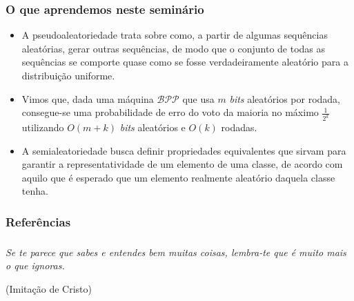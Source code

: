 \documentclass{beamer}
\def\clBPP{\mathcal{BPP}}
\theoremstyle{teoaxicorlem}
\theoremstyle{defnotnom}
\begin{document}
\begin{frame}
  \frametitle{O que aprendemos neste seminário}
  \begin{itemize}
    \item A pseudoaleatoriedade trata sobre como, a partir de algumas
      sequências aleatórias, gerar outras sequências, de modo que
      o conjunto
      de todas as sequências se comporte quase
      como se fosse verdadeiramente
      aleatório para a distribuição uniforme.\pause
    \item Vimos que, dada uma máquina $\clBPP$ que usa $m$
      \textit{bits} aleatórios por
      rodada, consegue-se uma probabilidade de erro do voto da maioria
      no      máximo $\frac{1}{2^k}$ utilizando $O(m+k)$ \textit{bits}
      aleatórios      e      $O(k)$ rodadas.\pause
    \item A semialeatoriedade busca definir propriedades equivalentes
      que sirvam para garantir a representatividade de um elemento de
      uma classe, de acordo com aquilo que é esperado que um elemento
      realmente aleatório daquela classe tenha.
  \end{itemize}
\end{frame}

\begin{frame}
  \frametitle{Referências}
  \nocite{Quasi-random-subsets}
  \nocite{Quasi-random-graphs}
  \nocite{Chazelle-2000}
  
  
\end{frame}

\begin{frame}
  \frametitle{}
  \hfill
  \parbox{.618034\linewidth}{
    \slshape
    Se te parece que sabes e entendes bem muitas coisas, lembra-te que é
    muito mais o que ignoras.

    \begin{flushright}
      \upshape
      (Imitação de Cristo)
    \end{flushright}
  }
\end{frame}
\end{document}
